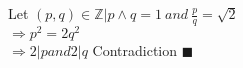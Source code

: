\documentclass{article}
\begin{document}
\noindent Let $(p, q) \in \mathbb{Z} | p \land q = 1 \ and \ \frac{p}{q} = \sqrt{2}$\\
$\Rightarrow p^2 = 2q^2$ \\
$\Rightarrow 2 | p and 2 | q$ Contradiction $\blacksquare$\\
\end{document}
